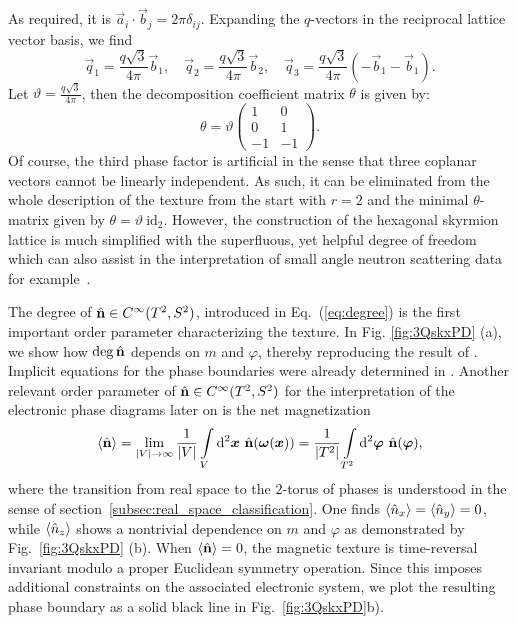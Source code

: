 \documentclass[submission, Phys]{SciPost}
\begin{document}
As required, it is $\vec{a}_i\cdot \vec{b}_j=2\pi\delta_{ij}$. 
Expanding the $q$-vectors in the reciprocal lattice vector basis, we find
\begin{equation}
    \vec{q}_1 = \frac{q\sqrt{3}}{4\pi} \vec{b}_1, \quad \vec{q}_2 = \frac{q\sqrt{3}}{4\pi} \vec{b}_2, \quad \vec{q}_3 = \frac{q\sqrt{3}}{4\pi} (-\vec{b}_1-\vec{b}_1).
\end{equation}
Let $\vartheta=\frac{q\sqrt{3}}{4\pi}$, then the decomposition coefficient matrix $\theta$ is given by:
\begin{equation}
    \theta = \vartheta \begin{pmatrix} 1 & 0 \\ 0 & 1 \\ -1 & -1 \end{pmatrix}.
\end{equation}
Of course, the third phase factor is artificial in the sense that three coplanar vectors cannot be linearly independent. 
As such, it can be eliminated from the whole description of the texture from the start with $r=2$ and the minimal $\theta$-matrix given by $\theta= \vartheta~\mathrm{id}_2$.
However, the construction of the hexagonal skyrmion lattice is much simplified with the superfluous, yet helpful degree of freedom which can also assist in the interpretation of small angle neutron scattering data for example~\cite{Muhlbauer2009}.

\figureI

The degree of $\hat{\mathbf{n}} \in C^\infty(T^2,S^2)$, introduced in Eq.~(\ref{eq:degree}) is the first important order parameter characterizing the texture.
In Fig. \ref{fig:3QskxPD} (a), we show how $\deg \hat{\mathbf{n}}$ depends on $m$ and $\varphi$, thereby reproducing the result of \cite[Fig.~6]{Shimizu2022}.
Implicit equations for the phase boundaries were already determined in \cite[Eq.~(29)]{Shimizu2022}.
Another relevant order parameter of $\hat{\mathbf{n}} \in C^\infty(T^2,S^2)$ for the interpretation of the electronic phase diagrams later on is the net magnetization
\begin{align}
    \braket{\hat{\mathbf{n}}} = \lim\limits_{|V|\to\infty} \frac{1}{|V|} \int\limits_V \mathrm{d}^2 \boldsymbol{x} ~ \hat{\mathbf{n}}(\boldsymbol{\omega}(\boldsymbol{x})) =\frac{1}{|T^2|}
\int\limits_{T^2}\mathrm{d}^2\boldsymbol{\varphi} ~ \hat{\mathbf{n}}(\boldsymbol{\varphi}),
\label{eq:magnetization_formula}
\end{align}
where the transition from real space to the $2$-torus of phases is understood in the sense of section~\ref{subsec:real_space_classification}.
One finds $\braket{\hat{n}_x} =\braket{\hat{n}_y}=0$, while $\braket{\hat{n}_z}$ shows a nontrivial dependence on $m$ and $\varphi$ as demonstrated by Fig.~\ref{fig:3QskxPD} (b).
When $\braket{\hat{\mathbf{n}}} = 0$, the magnetic texture is time-reversal invariant modulo a proper Euclidean symmetry operation. 
Since this imposes additional constraints on the associated electronic system, we plot the resulting phase boundary as a solid black line in Fig.~\ref{fig:3QskxPD}b).
\end{document}
